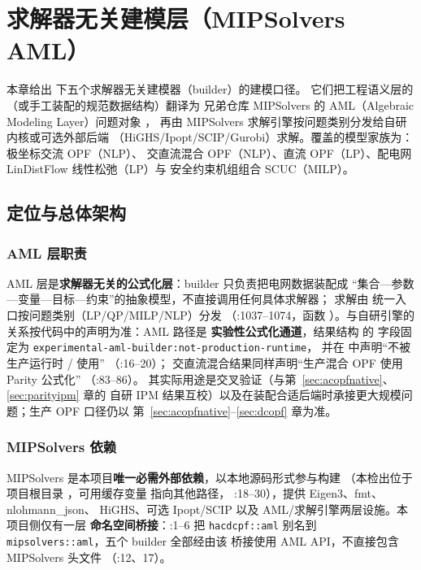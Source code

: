 \section{求解器无关建模层（MIPSolvers AML）}\label{sec:powermodels}

本章给出  下五个求解器无关建模器（builder）的建模口径。
它们把工程语义层的 （或手工装配的规范数据结构）翻译为
兄弟仓库 MIPSolvers 的 AML（Algebraic Modeling Layer）问题对象 ，
再由 MIPSolvers 求解引擎按问题类别分发给自研内核或可选外部后端
（HiGHS/Ipopt/SCIP/Gurobi）求解。覆盖的模型家族为：极坐标交流 OPF（NLP）、
交直流混合 OPF（NLP）、直流 OPF（LP）、配电网 LinDistFlow 线性松弛（LP）与
安全约束机组组合 SCUC（MILP）。

\subsection{定位与总体架构}

\subsubsection*{AML 层职责}
AML 层是\textbf{求解器无关的公式化层}：builder 只负责把电网数据装配成
“集合—参数—变量—目标—约束”的抽象模型，不直接调用任何具体求解器；
求解由  统一入口按问题类别（LP/QP/MILP/NLP）分发
（:1037--1074，函数
）。与自研引擎的关系按代码中的声明为准：AML 路径是
\textbf{实验性公式化通道}，结果结构  的
 字段固定为
\texttt{experimental-aml-\allowbreak builder:\allowbreak not-production-\allowbreak runtime}，
并在  中声明“不被生产运行时
/ 使用”
（:16--20）；
交直流混合结果同样声明“生产混合 OPF 使用 Parity 公式化”
（:83--86）。
其实际用途是交叉验证（与第~\ref{sec:acopfnative}、\ref{sec:parityipm} 章的
自研 IPM 结果互校）以及在装配合适后端时承接更大规模问题；生产 OPF 口径仍以
第~\ref{sec:acopfnative}--\ref{sec:dcopf} 章为准。

\subsubsection*{MIPSolvers 依赖}
MIPSolvers 是本项目\textbf{唯一必需外部依赖}，以本地源码形式参与构建
（本检出位于项目根目录 ，可用缓存变量
 指向其他路径，
:18--30），提供 Eigen3、fmt、nlohmann\_json、
HiGHS、可选 Ipopt/SCIP 以及 AML/求解引擎两层设施。本项目侧仅有一层
\textbf{命名空间桥接}：:1--6 把
\texttt{hacdcpf::aml} 别名到 \texttt{mipsolvers::aml}，五个 builder 全部经由该
桥接使用 AML API，不直接包含 MIPSolvers 头文件
（:12、17）。

